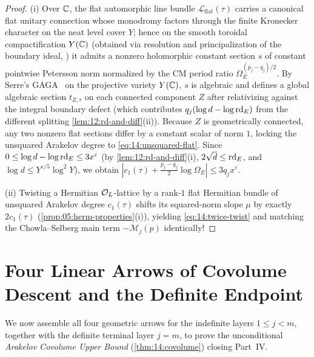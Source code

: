 \begin{proof}
(i) Over $\mathbb{C}$, the flat automorphic line bundle $\mathcal{L}_{\mathrm{flat}}(\tau)$ carries a canonical flat unitary connection whose monodromy factors through the finite Kronecker character on the neat level cover $Y$; hence on the smooth toroidal compactification $Y(\mathbb{C})$ (obtained via resolution and principalization of the boundary ideal, \cite{Hironaka1964}) it admits a nonzero holomorphic constant section $s$ of constant pointwise Petersson norm normalized by the CM period ratio $\Omega_E^{(p_j - q_j)/2}$. By Serre's GAGA~\cite{Serre1956} on the projective variety $Y(\mathbb{C})$, $s$ is algebraic and defines a global algebraic section $t_{Z, \tau}$ on each connected component $Z$ after relativizing against the integral boundary defect (which contributes $q_j(\log d - \log\mathrm{rd}_E)$ from the different splitting \cref{lem:12:rd-and-diff}(ii)). Because $Z$ is geometrically connected, any two nonzero flat sections differ by a constant scalar of norm $1$, locking the unsquared Arakelov degree to \eqref{eq:14:unsquared-flat}. Since $0 \le \log d - \log\mathrm{rd}_E \le 3 x^\varepsilon$ (by \cref{lem:12:rd-and-diff}(i), $2\sqrt{d} \le \mathrm{rd}_E$, and $\log d \le Y^{\varepsilon/5}\log^2 Y$), we obtain $|c_1(\tau) + \frac{p_j - q_j}{2}\log\Omega_E| \le 3 q_j x^\varepsilon$.

(ii) Twisting a Hermitian $\mathcal{O}_L$-lattice by a rank-$1$ flat Hermitian bundle of unsquared Arakelov degree $c_1(\tau)$ shifts its squared-norm slope $\mu$ by exactly $2 c_1(\tau)$ (\cref{prop:05:herm-properties}(i)), yielding \eqref{eq:14:twice-twist} and matching the Chowla--Selberg main term $-\mathcal{M}_j(p)$ identically!
\end{proof}

\section{Four Linear Arrows of Covolume Descent and the Definite Endpoint}
\label{sec:14:covolume-theorem}

We now assemble all four geometric arrows for the indefinite layers $1 \le j < m$, together with the definite terminal layer $j = m$, to prove the unconditional \emph{Arakelov Covolume Upper Bound} (\cref{thm:14:covolume}) closing Part~IV.

